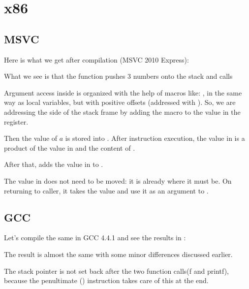 \section{x86}

\subsection{MSVC}

Here is what we get after compilation (MSVC 2010 Express):




What we see is that the \main function pushes 3 numbers onto the stack and calls  

Argument access inside \ttf is organized with the help of macros like: , 
in the same way as local variables, but with positive offsets (addressed with ).
So, we are addressing the  side of the \gls{stack frame} by adding the  macro to the value in the \EBP register.


Then the value of $a$ is stored into \EAX. After \IMUL instruction execution, the value in \EAX is 
a \gls{product} of the value in \EAX and the content of .

After that, \ADD adds the value in  to \EAX.

The value in \EAX does not need to be moved: it is already where it must be.
On returning to \gls{caller}, it takes the \EAX value and use it as an argument to \printf.



\subsection{GCC}

Let's compile the same in GCC 4.4.1 and see the results in \IDA:



The result is almost the same with some minor differences discussed earlier.

The \gls{stack pointer} is not set back after the two function calls(f and printf), 
because the penultimate  () 
instruction takes care of this at the end.
